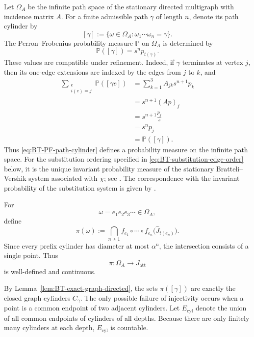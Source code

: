 \documentclass[11pt]{amsart}
\theoremstyle{plain}
\theoremstyle{definition}
\theoremstyle{remark}
\begin{document}
Let \(\Omega_A\) be the infinite path space of the stationary directed
multigraph with incidence matrix \(A\). For a finite admissible path
\(\gamma\) of length \(n\), denote its path cylinder by
\[
        [\gamma]
        :=
        \{
        \omega\in\Omega_A:
        \omega_1\cdots\omega_n=\gamma
        \}.
\]
The Perron--Frobenius probability measure \(\mathbb P\) on \(\Omega_A\)
is determined by
\[
        \mathbb P([\gamma])
        =
        s^n p_{t(\gamma)}.
\tag{B.5}
\label{eq:BT-PF-path-cylinder}
\]
These values are compatible under refinement. Indeed, if \(\gamma\)
terminates at vertex \(j\), then its one-edge extensions are indexed by
the edges from \(j\) to \(k\), and
\[
\begin{aligned}
\sum_{\substack{e\\i(e)=j}}
\mathbb P([\gamma e])
&=
\sum_{k=1}^{3}A_{jk}s^{n+1}p_k\\
&=
s^{n+1}(Ap)_j\\
&=
s^{n+1}\frac{p_j}{s}\\
&=
s^np_j\\
&=
\mathbb P([\gamma]).
\end{aligned}
\]
Thus \eqref{eq:BT-PF-path-cylinder} defines a probability measure on
the infinite path space. For the substitution ordering specified in
\eqref{eq:BT-substitution-edge-order} below, it is the unique invariant
probability measure of the stationary Bratteli--Vershik system associated
with \(\chi\); see
\cite[Theorem~3.8 and Remark~3.9]{BezuglyiKwiatkowskiMedynetsSolomyak2010}.
The correspondence with the invariant probability of the substitution
system is given by
\cite[Theorem~5.4]{BezuglyiKwiatkowskiMedynetsSolomyak2010}.

For
\[
        \omega=e_1e_2e_3\cdots\in\Omega_A,
\]
define
\[
        \pi(\omega)
        :=
        \bigcap_{n\geq1}
        f_{e_1}\circ\cdots\circ f_{e_n}
        \bigl(
        \widehat J_{t(e_n)}
        \bigr).
\]
Since every prefix cylinder has diameter at most \(\alpha^n\), the
intersection consists of a single point. Thus
\[
        \pi:\Omega_A\longrightarrow J_{\mathrm{att}}
\]
is well-defined and continuous.

By Lemma~\ref{lem:BT-exact-graph-directed}, the sets
\(\pi([\gamma])\) are exactly the closed graph cylinders \(C_\gamma\).
The only possible failure of injectivity occurs when a point is a common
endpoint of two adjacent cylinders. Let \(E_{\mathrm{cyl}}\) denote the
union of all common endpoints of cylinders of all depths. Because there
are only finitely many cylinders at each depth, \(E_{\mathrm{cyl}}\) is
countable.
\end{document}
